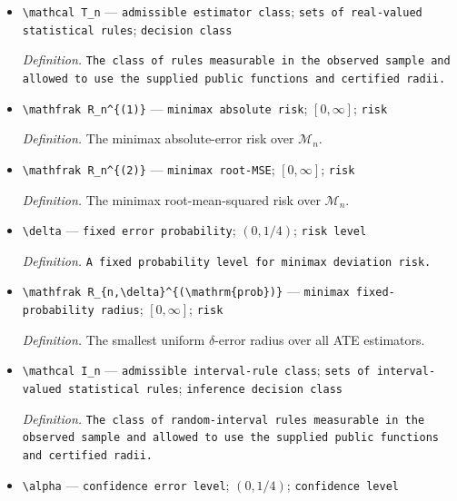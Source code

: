 \documentclass{article}
\begin{document}
\begin{itemize}
  \item \texttt{\textbackslash{}\allowbreak{}mathcal T\_\allowbreak{}n} --- \texttt{admissible estimator class}; \texttt{sets of real-\allowbreak{}valued statistical rules}; \texttt{decision class}
  \par\smallskip\noindent\emph{Definition.} \texttt{The class of rules measurable in the observed sample and allowed to use the supplied public functions and certified radii.}
  \item \texttt{\textbackslash{}\allowbreak{}mathfrak R\_\allowbreak{}n\textasciicircum{}\{(1)\}\allowbreak{}} --- \texttt{minimax absolute risk}; \([0,\infty]\); \texttt{risk}
  \par\smallskip\noindent\emph{Definition.} The minimax absolute-error risk over \(\mathcal M_n\).
  \item \texttt{\textbackslash{}\allowbreak{}mathfrak R\_\allowbreak{}n\textasciicircum{}\{(2)\}\allowbreak{}} --- \texttt{minimax root-\allowbreak{}MSE}; \([0,\infty]\); \texttt{risk}
  \par\smallskip\noindent\emph{Definition.} The minimax root-mean-squared risk over \(\mathcal M_n\).
  \item \texttt{\textbackslash{}\allowbreak{}delta} --- \texttt{fixed error probability}; \((0,1/4)\); \texttt{risk level}
  \par\smallskip\noindent\emph{Definition.} \texttt{A fixed probability level for minimax deviation risk.}
  \item \texttt{\textbackslash{}\allowbreak{}mathfrak R\_\allowbreak{}\{n,\allowbreak{}\textbackslash{}\allowbreak{}delta\}\allowbreak{}\textasciicircum{}\{(\textbackslash{}\allowbreak{}mathrm\{prob\}\allowbreak{})\}\allowbreak{}} --- \texttt{minimax fixed-\allowbreak{}probability radius}; \([0,\infty]\); \texttt{risk}
  \par\smallskip\noindent\emph{Definition.} The smallest uniform \(\delta\)-error radius over all ATE estimators.
  \item \texttt{\textbackslash{}\allowbreak{}mathcal I\_\allowbreak{}n} --- \texttt{admissible interval-\allowbreak{}rule class}; \texttt{sets of interval-\allowbreak{}valued statistical rules}; \texttt{inference decision class}
  \par\smallskip\noindent\emph{Definition.} \texttt{The class of random-\allowbreak{}interval rules measurable in the observed sample and allowed to use the supplied public functions and certified radii.}
  \item \texttt{\textbackslash{}\allowbreak{}alpha} --- \texttt{confidence error level}; \((0,1/4)\); \texttt{confidence level}

\end{itemize}
\end{document}
